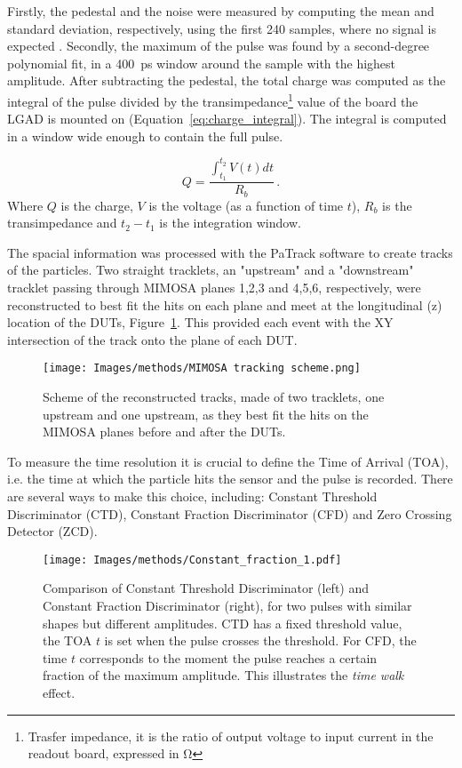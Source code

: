 Firstly, the pedestal and the noise were measured by computing the mean and standard deviation, respectively, using the first 240 samples, where no signal is expected \cite{Allaire:2018bof}. Secondly, the maximum of the pulse was found by a second-degree polynomial fit, in a \qty{400}{\pico\second} window around the sample with the highest amplitude. After subtracting the pedestal, the total charge was computed as the integral of the pulse divided by the transimpedance\footnote{Trasfer impedance, it is the ratio of output voltage to input current in the readout board, expressed in \unit{\ohm}} value of the board the LGAD is mounted on (Equation~\ref{eq:charge_integral}). The integral is computed in a window wide enough to contain the full pulse.

\begin{equation}\label{eq:charge_integral}
    Q = \frac{\int_{t_1}^{t_2} V(t)dt}{R_b} \, .
\end{equation}
Where \(Q\) is the charge, \(V\) is the voltage (as a function of time \(t\)), \(R_b\) is the transimpedance and \(t_2-t_1\) is the integration window.

The spacial information was processed with the PaTrack software to create tracks of the particles. Two straight tracklets, an "upstream" and a "downstream" tracklet passing through MIMOSA planes 1,2,3 and 4,5,6, respectively, were reconstructed to best fit the hits on each plane and meet at the longitudinal (z) location of the DUTs, Figure~\ref{fig:mimosa_tracking}. This provided each event with the XY intersection of the track onto the plane of each DUT. 

\begin{figure}[h!btp]
    \centering
    \texttt{[image: Images/methods/MIMOSA tracking scheme.png]}
    \captionsetup{width=\captionwidth}
    \caption{Scheme of the reconstructed tracks, made of two tracklets, one upstream and one upstream, as they best fit the hits on the MIMOSA planes before and after the DUTs.}
    \label{fig:mimosa_tracking}
\end{figure} 


To measure the time resolution it is crucial to define the Time of Arrival (TOA), i.e. the time at which the particle hits the sensor and the pulse is recorded. There are several ways to make this choice, including: Constant Threshold Discriminator (CTD), Constant Fraction Discriminator (CFD) and Zero Crossing Detector (ZCD).

\begin{figure}[h!btp]
    \centering
    \texttt{[image: Images/methods/Constant\_fraction\_1.pdf]}
    \captionsetup{width=\captionwidth}
    \caption{Comparison of Constant Threshold Discriminator (left) and Constant Fraction Discriminator (right), for two pulses with similar shapes but different amplitudes. CTD has a fixed threshold value, the TOA \(t\) is set when the pulse crosses the threshold. For CFD, the time \(t\) corresponds to the moment the pulse reaches a certain fraction of the maximum amplitude. This illustrates the \textit{time walk} effect.}
    \label{fig:constant fraction}
\end{figure} 

